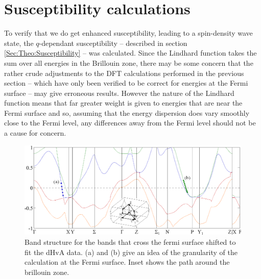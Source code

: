 
\section{Susceptibility calculations}
    \label{Sec:ResD:SubsceptibilityCalculation}

To verify that we do get enhanced susceptibility, leading to a spin-density wave state, the $q$-dependant susceptibility -- described in section \ref{Sec:Theo:Susceptibility} -- was calculated. Since the Lindhard function takes the sum over all energies in the Brillouin zone, there may be some concern that the rather crude adjustments to the DFT calculations performed in the previous section -- which have only been verified to be correct for energies at the Fermi surface -- may give erroneous results. However the nature of the Lindhard function means that far greater weight is given to energies that are near the Fermi surface and so, assuming that the energy dispersion does vary smoothly close to the Fermi level, any differences away from the Fermi level should not be a cause for concern.
\begin{figure}[htbp]
    \begin{center}
        \includegraphics[scale=0.9]{Chapter-dHvABaFe2P2/Figures/AngleDepMeasurements/ShiftedBandStructure/ShiftedBandStructure}
        \caption{Band structure for the bands that cross the fermi surface shifted to fit the dHvA data. (a) and (b) give an idea of the granularity of the \WIEN calculation at the Fermi surface. Inset shows the path around the brillouin zone.}
        \label{Fig:ResD:ShiftedBandStructure}
    \end{center}
\end{figure}
